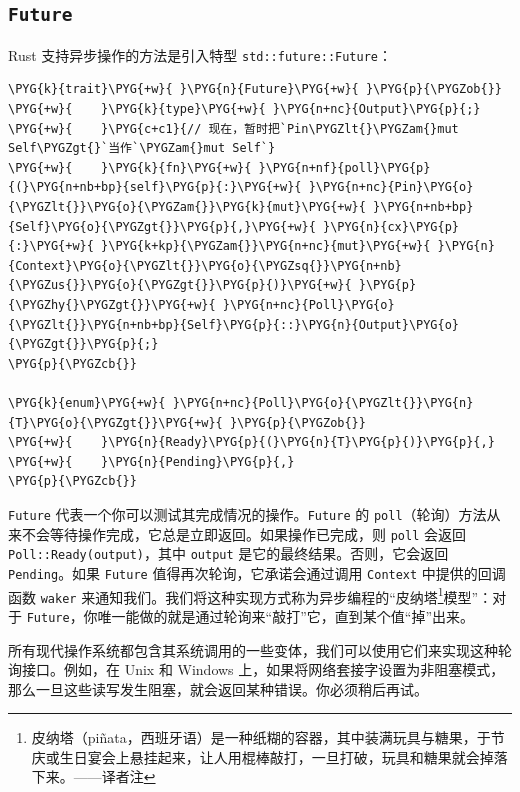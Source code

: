\subsection{\texttt{Future}}

Rust 支持异步操作的方法是引入特型 \texttt{std::future::Future}：

\begin{Verbatim}[commandchars=\\\{\},breaklines=true,breakanywhere=true,fontsize=\codefont,xleftmargin=17bp]
\PYG{k}{trait}\PYG{+w}{ }\PYG{n}{Future}\PYG{+w}{ }\PYG{p}{\PYGZob{}}
\PYG{+w}{    }\PYG{k}{type}\PYG{+w}{ }\PYG{n+nc}{Output}\PYG{p}{;}
\PYG{+w}{    }\PYG{c+c1}{// 现在，暂时把`Pin\PYGZlt{}\PYGZam{}mut Self\PYGZgt{}`当作`\PYGZam{}mut Self`}
\PYG{+w}{    }\PYG{k}{fn}\PYG{+w}{ }\PYG{n+nf}{poll}\PYG{p}{(}\PYG{n+nb+bp}{self}\PYG{p}{:}\PYG{+w}{ }\PYG{n+nc}{Pin}\PYG{o}{\PYGZlt{}}\PYG{o}{\PYGZam{}}\PYG{k}{mut}\PYG{+w}{ }\PYG{n+nb+bp}{Self}\PYG{o}{\PYGZgt{}}\PYG{p}{,}\PYG{+w}{ }\PYG{n}{cx}\PYG{p}{:}\PYG{+w}{ }\PYG{k+kp}{\PYGZam{}}\PYG{n+nc}{mut}\PYG{+w}{ }\PYG{n}{Context}\PYG{o}{\PYGZlt{}}\PYG{o}{\PYGZsq{}}\PYG{n+nb}{\PYGZus{}}\PYG{o}{\PYGZgt{}}\PYG{p}{)}\PYG{+w}{ }\PYG{p}{\PYGZhy{}\PYGZgt{}}\PYG{+w}{ }\PYG{n+nc}{Poll}\PYG{o}{\PYGZlt{}}\PYG{n+nb+bp}{Self}\PYG{p}{::}\PYG{n}{Output}\PYG{o}{\PYGZgt{}}\PYG{p}{;}
\PYG{p}{\PYGZcb{}}

\PYG{k}{enum}\PYG{+w}{ }\PYG{n+nc}{Poll}\PYG{o}{\PYGZlt{}}\PYG{n}{T}\PYG{o}{\PYGZgt{}}\PYG{+w}{ }\PYG{p}{\PYGZob{}}
\PYG{+w}{    }\PYG{n}{Ready}\PYG{p}{(}\PYG{n}{T}\PYG{p}{)}\PYG{p}{,}
\PYG{+w}{    }\PYG{n}{Pending}\PYG{p}{,}
\PYG{p}{\PYGZcb{}}
\end{Verbatim}

\texttt{Future} 代表一个你可以测试其完成情况的操作。\texttt{Future} 的 \texttt{poll}（轮询）方法从来不会等待操作完成，它总是立即返回。如果操作已完成，则 \texttt{poll} 会返回 \texttt{Poll::Ready(output)}，其中 \texttt{output} 是它的最终结果。否则，它会返回 \texttt{Pending}。如果 \texttt{Future} 值得再次轮询，它承诺会通过调用 \texttt{Context} 中提供的回调函数 \texttt{waker} 来通知我们。我们将这种实现方式称为异步编程的“皮纳塔\footnote{皮纳塔（piñata，西班牙语）是一种纸糊的容器，其中装满玩具与糖果，于节庆或生日宴会上悬挂起来，让人用棍棒敲打，一旦打破，玩具和糖果就会掉落下来。——译者注}模型”：对于 \texttt{Future}，你唯一能做的就是通过轮询来“敲打”它，直到某个值“掉”出来。

所有现代操作系统都包含其系统调用的一些变体，我们可以使用它们来实现这种轮询接口。例如，在 Unix 和 Windows 上，如果将网络套接字设置为非阻塞模式，那么一旦这些读写发生阻塞，就会返回某种错误。你必须稍后再试。

